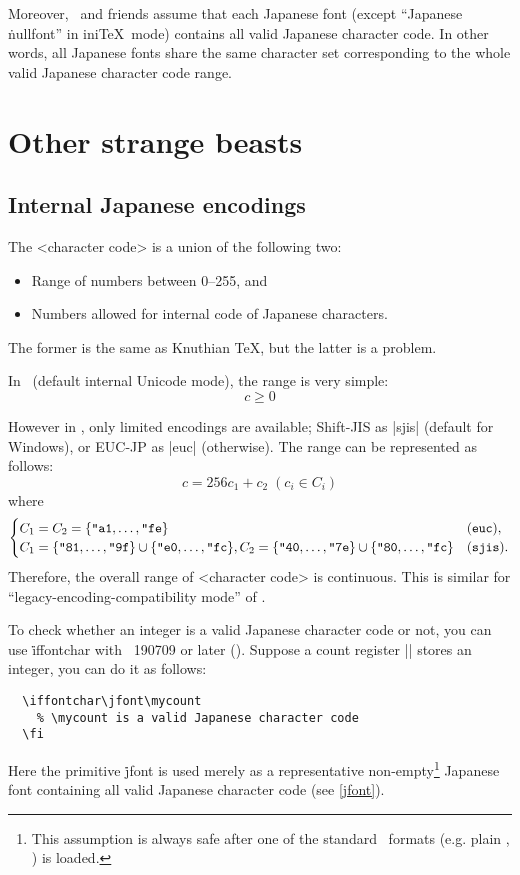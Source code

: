 \documentclass[a4paper,11pt,dvipdfmx]{article}
\let\emph=\origemph
\begin{document}
Moreover, \pTeX\ and friends assume that each Japanese font
(except ``Japanese \.{nullfont}'' in ini\TeX\ mode)
contains all valid Japanese character code.
In other words, all Japanese fonts share the same character set
corresponding to the whole valid Japanese character code range.\label{jfont}

\section{Other strange beasts}


\subsection{Internal Japanese encodings}\label{kanji-internal}

The <character code> is a union of the following two:
\begin{itemize}
 \item Range of numbers between 0--255, and
 \item Numbers allowed for internal code of Japanese characters.
\end{itemize}
The former is the same as Knuthian \TeX, but the latter is a problem.

In \upTeX\ (default internal Unicode mode), the range is very simple:
\[ c \ge 0 \]

However in \pTeX, only limited encodings are available;
Shift-JIS as |sjis| (default for \TL Windows), or
EUC-JP as |euc| (otherwise).
The range can be represented as follows:
\[
  c = 256c_1+c_2 \; (c_i\in C_i)
\]
where
\[
  \begin{cases}
    C_1=C_2=\{\hex{a1},\dots,\hex{fe}\} & (\mathtt{euc}), \\
    C_1=\{\hex{81},\dots,\hex{9f}\}\cup\{\hex{e0},\dots,\hex{fc}\},
    C_2=\{\hex{40},\dots,\hex{7e}\}\cup\{\hex{80},\dots,\hex{fc}\} & (\mathtt{sjis}).
  \end{cases}
\]
Therefore, the overall range of <character code> is \emph{not} continuous.
This is similar for ``legacy-encoding-compatibility mode'' of \upTeX.

To check whether an integer is a valid Japanese character code or not,
you can use \.{iffontchar} with \epTeX~190709 or later ().
Suppose a count register |\mycount| stores an integer, you can do it as follows:
\begin{verbatim}
  \iffontchar\jfont\mycount
    % \mycount is a valid Japanese character code
  \fi
\end{verbatim}
Here the primitive \.{jfont} is used merely as
a representative non-empty\footnote{This assumption is always safe after
one of the standard \pTeX\ formats (e.g. plain \pTeX, \pLaTeX) is loaded.}
Japanese font containing all valid Japanese character code (see \ref{jfont}).
\end{document}

